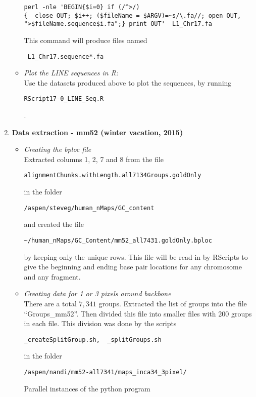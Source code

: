\documentclass[11pt]{article}
\begin{document}
\begin{enumerate}
\begin{itemize}
\begin{verbatim}
perl -nle 'BEGIN{$i=0} if (/^>/) 
{  close OUT; $i++; ($fileName = $ARGV)=~s/\.fa//; open OUT, 
">$fileName.sequence$i.fa";} print OUT'  L1_Chr17.fa
\end{verbatim}
This command will produce files named \begin{verbatim} L1_Chr17.sequence*.fa \end{verbatim}
\item
\emph{Plot the LINE sequences in R:} \\
Use the datasets produced above to plot the sequences, by running 
\begin{verbatim} 
RScript17-0_LINE_Seq.R 
\end{verbatim}. 
\end{itemize}

\item
{\bf{Data extraction - mm52 (winter vacation, 2015)}}
\begin{itemize}
\item \emph{Creating the bploc file} \\
Extracted columns 1, 2, 7 and 8 from the file 
\begin{verbatim}
alignmentChunks.withLength.all7134Groups.goldOnly
\end{verbatim}
in the folder
\begin{verbatim}
/aspen/steveg/human_nMaps/GC_content
\end{verbatim}
and created the file 
\begin{verbatim}
~/human_nMaps/GC_Content/mm52_all7431.goldOnly.bploc
\end{verbatim} 
by keeping only the unique rows. This file will be read in by RScripts to give the beginning and ending base pair locations for any chromosome and any fragment.
\item \emph{Creating data for 1 or 3 pixels around backbone} \\
There are a total $7,341$ groups. Extracted the list of groups into the file ``Groups\_mm52''. Then divided this file into smaller files with 200 groups in each file. This division was done by the scripts 
\begin{verbatim}
_createSplitGroup.sh,  _splitGroups.sh
\end{verbatim}
in the folder 
\begin{verbatim}
/aspen/nandi/mm52-all7341/maps_inca34_3pixel/
\end{verbatim}
Parallel instances of the python program 
\begin{verbatim}

\end{verbatim}
\end{itemize}
\end{enumerate}
\end{document}
